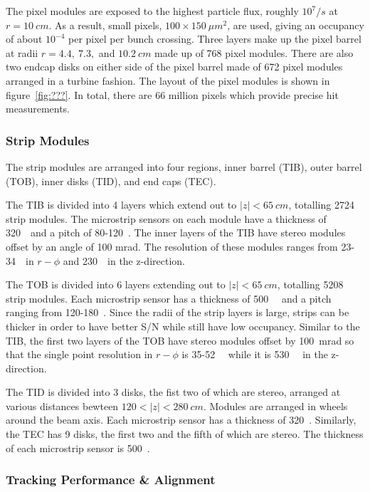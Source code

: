 The pixel modules are exposed to the highest particle flux, roughly $10^7/s$
at $r=10~cm$.  As a result, small pixels, $100\times150~\mu m^2$, are used,
giving an occupancy of about $10^{-4}$ per pixel per bunch crossing. Three
layers make up the pixel barrel at radii $r=4.4,~7.3,$ and $10.2~cm$ made
up of 768 pixel modules.  There are also two endcap disks on either side of 
the pixel barrel made of 672 pixel modules arranged in a turbine fashion. 
The layout of the pixel modules is shown in figure~\ref{fig:???}.
In total, there are 66 million pixels which provide precise hit measurements.

\subsubsection{Strip Modules}

The strip modules are arranged into four regions, inner barrel (TIB), 
outer barrel (TOB), inner disks (TID), and end caps (TEC). 

The TIB is divided into 4 layers which extend out to $|z|<65~cm$, totalling
2724 strip modules.  The microstrip sensors on each module have a thickness
of 320~\microns~and a pitch of 80-120~\microns. The inner layers of the TIB
have stereo modules offset by an angle of 100 mrad.  The resolution of these
modules ranges from 23-34~\microns~in $r-\phi$ and 230~\microns~in 
the z-direction.

The TOB is divided into 6 layers extending out to $|z|<65~cm$, totalling
5208 strip modules.  Each microstrip sensor has a thickness of 500~\microns~
and a pitch ranging from 120-180~\microns.  Since the radii of the strip
layers is large, strips can be thicker in order to have better S/N while 
still have low occupancy.  Similar to the TIB, the first two layers of the
TOB have stereo modules offset by 100~mrad so that the single point resolution
in $r-\phi$ is 35-52~\microns~ while it is 530~\microns~ in the z-direction.

The TID is divided into 3 disks, the fist two of which are stereo, arranged
at various distances bewteen $120<|z|<280~cm$.  Modules
are arranged in wheels around the beam axis.  Each microstrip sensor has a 
thickness of 320~\microns.  Similarly, the TEC has 9 disks, the first two and 
the fifth of which are stereo.  The thickness of each microstrip sensor
is 500~\microns. 

\subsubsection{Tracking Performance \& Alignment}

